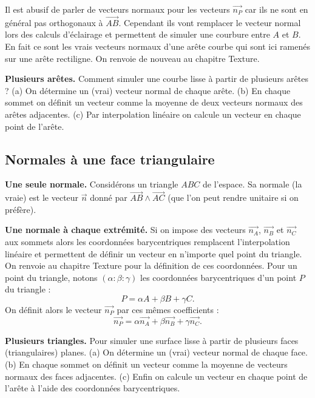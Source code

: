 \documentclass[11pt,class=report,crop=false]{standalone}
\begin{document}

Il est abusif de parler de \og{}vecteurs normaux\fg{} pour les vecteurs $\vec{n_P}$ car ils ne sont en général pas orthogonaux à $\vec{AB}$. Cependant ils vont remplacer le vecteur normal lors des calculs d'éclairage et permettent de simuler une courbure entre $A$ et $B$. En fait ce sont les vrais vecteurs normaux d'une arête courbe qui sont ici ramenés sur une arête rectiligne. On renvoie de nouveau au chapitre \og{}Texture\fg{}.


\medskip
\textbf{Plusieurs arêtes.}
Comment simuler une courbe lisse à partir de plusieurs arêtes ?
(a) On détermine un (vrai) vecteur normal de chaque arête.
(b) En chaque sommet on définit un vecteur comme la moyenne de deux vecteurs normaux des arêtes adjacentes. 
(c) Par interpolation linéaire on calcule un vecteur en chaque point de l'arête.


\subsection{Normales à une face triangulaire}


\textbf{Une seule normale.}
Considérons un triangle $ABC$ de l'espace.
Sa normale (la vraie) est le vecteur $\vec n$ donné par $\vec{AB} \wedge \vec{AC}$ (que l'on peut rendre unitaire si on préfère).




\medskip
\textbf{Une normale à chaque extrémité.}
Si on impose des vecteurs $\vec{n_A}$, $\vec{n_B}$ et $\vec{n_C}$ aux sommets alors les coordonnées barycentriques remplacent l'interpolation linéaire et permettent de définir un vecteur en n'importe quel point du triangle. On renvoie au chapitre \og{}Texture\fg{} pour la définition de ces coordonnées.
Pour un point du triangle, notons $(\alpha:\beta:\gamma)$ les coordonnées barycentriques d'un point $P$ du triangle :
$$P = \alpha A + \beta B + \gamma C.$$
On définit alors le vecteur $\vec{n_P}$ par ces mêmes coefficients :
$$\vec{n_P} = \alpha\vec{n_A} + \beta \vec{n_B} + \gamma \vec{n_C}.$$



\medskip
\textbf{Plusieurs triangles.}
Pour simuler une surface lisse à partir de plusieurs faces (triangulaires) planes.
(a) On détermine un (vrai) vecteur normal de chaque face.
(b) En chaque sommet on définit un vecteur comme la moyenne de vecteurs normaux des faces adjacentes. 
(c) Enfin on calcule un vecteur en chaque point de l'arête à l'aide des coordonnées barycentriques.
\end{document}
